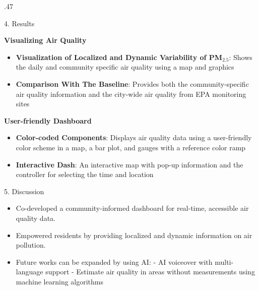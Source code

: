 \documentclass{beamer}
\begin{document}
\begin{frame}[label=onlyone]
\begin{minipage}[t]{.985\textwidth}
\begin{columns}[t]
\begin{column}{.47\textwidth}
\begin{myblock1c}{4. Results}
\begin{flushleft}
\vspace{-1em}
\textbf{\color{MPI2}Visualizing Air Quality}
  \begin{itemize}
  \item \textbf{Visualization of Localized and Dynamic Variability of PM$_{2.5}$}:  \newline
  Shows the daily and community specific air quality using a map and graphics 
  \item \textbf{Comparison With The Baseline}:  \newline
  Provides both the community-specific air quality information and the city-wide air quality from EPA monitoring sites
  \end{itemize}

\textbf{\color{MPI2}User-friendly Dashboard}
  \begin{itemize}
  \item \textbf{Color-coded Components}: \newline
  Displays air quality data using a user-friendly color scheme in a map, a bar plot, and gauges with a reference color ramp
  \item \textbf{Interactive Dash}: \newline
  An interactive map with pop-up information and the controller for selecting the time and location
  \end{itemize}
\vspace{.2em}

\end{flushleft}

\end{myblock1c}

\begin{myblock1c}{5. Discussion}
\vspace{-1em}
\begin{itemize}
\item Co-developed a community-informed dashboard for real-time, accessible air quality data.
\item Empowered residents by providing localized and dynamic information on air pollution.
\item Future works can be expanded by using AI: \newline
- AI voiceover with multi-language support \newline
- Estimate air quality in areas without measurements using machine learning algorithms
\end{itemize}



\end{myblock1c}



\end{column}
\end{columns}
\end{minipage}
\end{frame}
\end{document}
